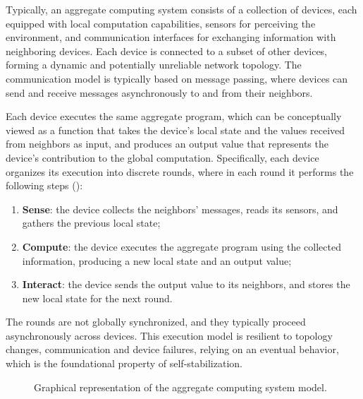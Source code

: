 \documentclass[runningheads]{llncs}
\begin{document}
Typically,
an aggregate computing system consists of a collection of devices, 
each equipped with local computation capabilities, 
sensors for perceiving the environment, 
and communication interfaces for exchanging information with neighboring devices.
%
Each device is connected to a subset of other devices,
forming a dynamic and potentially unreliable network topology.
%
The communication model is typically based on message passing, 
where devices can send and receive messages asynchronously to and from their neighbors.

Each device executes the same aggregate program, 
which can be conceptually viewed as a function that takes the device's local state and the values received from neighbors as input,
and produces an output value that represents the device's contribution to the global computation.
%
Specifically,
each device organizes its execution into discrete rounds, 
where in each round it performs the following steps ():
\begin{enumerate}
    \item \textbf{Sense}: the device collects the neighbors' messages, reads its sensors, and gathers the previous local state;
    \item \textbf{Compute}: the device executes the aggregate program using the collected information, producing a new local state and an output value;
    \item \textbf{Interact}: the device sends the output value to its neighbors, and stores the new local state for the next round.
\end{enumerate}

The rounds are not globally synchronized,
and they typically proceed asynchronously across devices.
%
This execution model is resilient to topology changes,
communication and device failures,
relying on an eventual behavior,
which is the foundational property of self-stabilization.

\begin{figure}
    \centering
    \def\svgwidth{0.8\textwidth}
    
    \caption{Graphical representation of the aggregate computing system model.}
    \label{fig:ac-model}
\end{figure}
\end{document}
